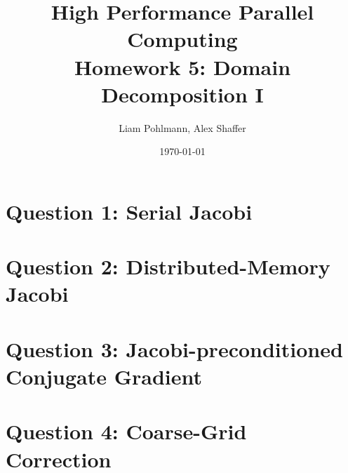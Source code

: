 \documentclass[11pt]{article}
\title{\textbf{High Performance Parallel Computing \\ Homework 5: Domain Decomposition I}}
\author{Liam Pohlmann, Alex Shaffer}
\date{\today}
\begin{document}
\maketitle

\section*{Question 1: Serial Jacobi}

\section*{Question 2: Distributed-Memory Jacobi}

\section*{Question 3: Jacobi-preconditioned Conjugate Gradient}

\section*{Question 4: Coarse-Grid Correction}
\end{document}
